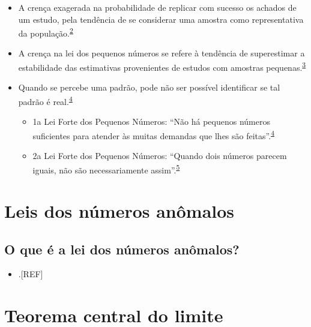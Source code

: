 \documentclass[
  a4paper,
]{book}
\providecommand{\tightlist}{%
  \setlength{\itemsep}{0pt}\setlength{\parskip}{0pt}}
\begin{document}
\begin{itemize}
\item
  A crença exagerada na probabilidade de replicar com sucesso os achados de um estudo, pela tendência de se considerar uma amostra como representativa da população.\textsuperscript{\protect\hyperlink{ref-tversky1971}{2}}
\item
  A crença na lei dos pequenos números se refere à tendência de superestimar a estabilidade das estimativas provenientes de estudos com amostras pequenas.\textsuperscript{\protect\hyperlink{ref-bishop2022}{3}}
\item
  Quando se percebe uma padrão, pode não ser possível identificar se tal padrão é real.\textsuperscript{\protect\hyperlink{ref-guy1988}{4}}

  \begin{itemize}
  \item
    1a Lei Forte dos Pequenos Números: ``Não há pequenos números suficientes para atender às muitas demandas que lhes são feitas''.\textsuperscript{\protect\hyperlink{ref-guy1988}{4}}
  \item
    2a Lei Forte dos Pequenos Números: ``Quando dois números parecem iguais, não são necessariamente assim''.\textsuperscript{\protect\hyperlink{ref-guy1990}{5}}
  \end{itemize}
\end{itemize}

\hypertarget{lei-numeros-anomals}{%
\section{Leis dos números anômalos}\label{lei-numeros-anomals}}

\hypertarget{o-que-uxe9-a-lei-dos-nuxfameros-anuxf4malos}{%
\subsection{O que é a lei dos números anômalos?}\label{o-que-uxe9-a-lei-dos-nuxfameros-anuxf4malos}}

\begin{itemize}
\tightlist
\item
  .{[}REF{]}
\end{itemize}

\hypertarget{teorema-central-limite}{%
\section{Teorema central do limite}\label{teorema-central-limite}}
\end{document}
